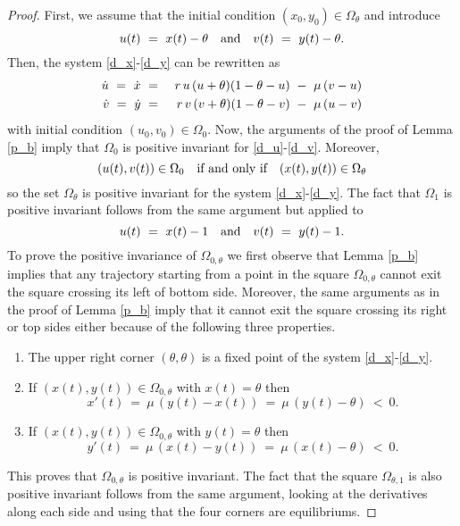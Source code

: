 \begin{proof}
 First, we assume that the initial condition $(x_0, y_0) \in \Omega_{\theta}$ and introduce
 $$ u (t) \ = \ x (t) - \theta \quad \hbox{and} \quad v (t) \ = \ y (t) - \theta. $$
 Then, the system \eqref{d_x}-\eqref{d_y} can be rewritten as
\begin{eqnarray}
\label{d_u}
 \dot{u} \ = \ \dot{x} \ & = & \ r \,u \,(u + \theta) (1 - \theta - u) \ - \ \mu \,(v - u) \vspace{4pt} \\
\label{d_v}
 \dot{v} \ = \ \dot{y} \ & = & \ r \,v \,(v + \theta) (1 - \theta - v) \ - \ \mu \,(u - v)
\end{eqnarray}
 with initial condition $(u_0, v_0) \in \Omega_0$.
 Now, the arguments of the proof of Lemma \ref{p_b} imply that $\Omega_0$ is positive invariant
 for \eqref{d_u}-\eqref{d_v}. Moreover,
 $$ (u (t), v (t)) \in \Omega_0 \quad \hbox{if and only if} \quad (x (t), y (t)) \in \Omega_{\theta} $$
 so the set $\Omega_{\theta}$ is positive invariant for the system \eqref{d_x}-\eqref{d_y}.
 The fact that $\Omega_1$ is positive invariant follows from the same argument but applied to
 $$ u (t) \ = \ x (t) - 1 \quad \hbox{and} \quad v (t) \ = \ y (t) - 1. $$
 To prove the positive invariance of $\Omega_{0, \theta}$ we first observe that Lemma \ref{p_b} implies that any
 trajectory starting from a point in the square $\Omega_{0, \theta}$ cannot exit the square crossing its left of
 bottom side.
 Moreover, the same arguments as in the proof of Lemma \ref{p_b} imply that it cannot exit the square crossing
 its right or top sides either because of the following three properties.
\begin{enumerate}
\item The upper right corner $(\theta, \theta)$ is a fixed point of the system \eqref{d_x}-\eqref{d_y}. \vspace{4pt}
\item If $(x (t), y (t)) \in \Omega_{0, \theta}$ with $x (t) = \theta$ then
 $$ x' (t) \ = \ \mu \,(y (t) - x (t)) \ = \ \mu \,(y (t) - \theta) \ < \ 0. $$
\item If $(x (t), y (t)) \in \Omega_{0, \theta}$ with $y (t) = \theta$ then
 $$ y' (t) \ = \ \mu \,(x (t) - y (t)) \ = \ \mu \,(x (t) - \theta) \ < \ 0. $$
\end{enumerate}
 This proves that $\Omega_{0, \theta}$ is positive invariant.
 The fact that the square $\Omega_{\theta, 1}$ is also positive invariant follows from the same argument, looking at the
 derivatives along each side and using that the four corners are equilibriums.

\end{proof}
